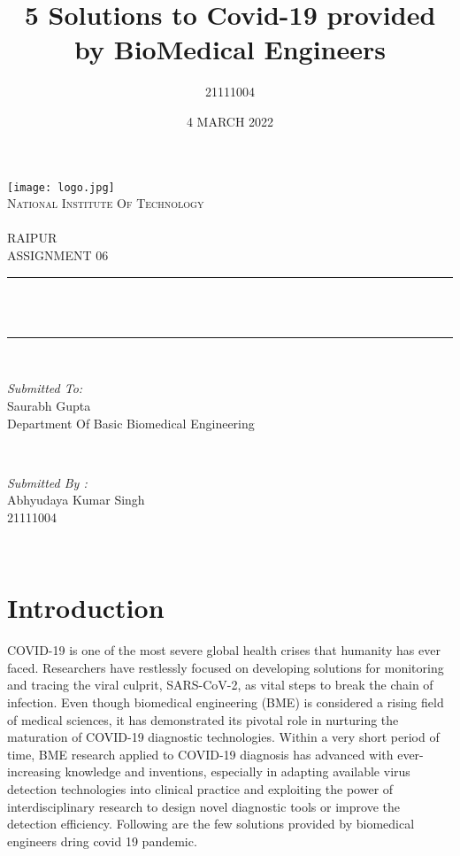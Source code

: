 \documentclass[12pt]{article}
\title{5 Solutions to Covid-19 provided by BioMedical Engineers}
\author{21111004}
\date{4 MARCH 2022}
\makeatletter
\let\thetitle\@title
\makeatother
\begin{document}
\begin{titlepage}
	\centering
    \texttt{[image: logo.jpg]}\\[1.0 cm]	
    \textsc{\LARGE National Institute Of Technology \newline\\\\ RAIPUR}\\[2.0 CM]
    
	\textsc{\Large ASSIGNMENT 06}\\[0.5 cm]				%
	\rule{\linewidth}{0.4 mm} \\[0.4 cm]
	{ \huge \bfseries \thetitle}\\
	\rule{\linewidth}{0.4 mm} \\[1.5 cm]
	
	\begin{minipage}{0.6\textwidth}
		\begin{flushleft} \large
			\emph{Submitted To:}\\
			Saurabh Gupta\\
            Department Of Basic Biomedical Engineering\\
			\end{flushleft}
			\end{minipage}~
			\begin{minipage}{0.4\textwidth}
            
			\begin{flushright} \large
			\emph{Submitted By :}\\
			Abhyudaya Kumar Singh\\
            21111004\\
		\end{flushright}
        
	\end{minipage}\\[2 cm]
\end{titlepage}

\tableofcontents
\pagebreak

\section{Introduction}
COVID-19 is one of the most severe global health crises that humanity has ever faced. Researchers have restlessly focused on developing solutions for monitoring and tracing the viral culprit, SARS-CoV-2, as vital steps to break the chain of infection. Even though biomedical engineering (BME) is considered a rising field of medical sciences, it has demonstrated its pivotal role in nurturing the maturation of COVID-19 diagnostic technologies. Within a very short period of time, BME research applied to COVID-19 diagnosis has advanced with ever-increasing knowledge and inventions, especially in adapting available virus detection technologies into clinical practice and exploiting the power of interdisciplinary research to design novel diagnostic tools or improve the detection efficiency. \newline
Following are the few solutions provided by biomedical engineers dring covid 19 pandemic.
\end{document}
